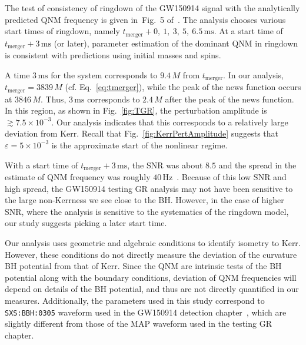 \tgr

The test of consistency of ringdown of the GW150914 signal with the analytically predicted QNM frequency is given in~Fig.~5 of~\cite{TheLIGOScientific:2016src}. The analysis chooses various start times of ringdown, namely $t_\mathrm{merger} + 0,~1,~3,~5,~6.5\,\mathrm{ms}$. At a start time of $t_\mathrm{merger} + 3\,\mathrm{ms}$ (or later), parameter estimation of the dominant QNM in ringdown is consistent with predictions using initial masses and spins. 

A time $3\,\mathrm{ms}$ for the system corresponds to $9.4\,M$ from $t_\mathrm{merger}$. In our analysis, $t_\mathrm{merger} = 3839\,M$ (cf. Eq.~\eqref{eq:tmerger}), while the peak of the news function occurs at $3846\,M$. Thus, $3\,\mathrm{ms}$ corresponds to $2.4\,M$ after the peak of the news function. In this region, as shown in Fig.~\ref{fig:TGR}, the perturbation amplitude is ${}\gtrsim 7.5 \times 10^{-3}$. Our analysis indicates that this corresponds to a relatively large deviation from Kerr. Recall that Fig.~\ref{fig:KerrPertAmplitude} suggests that $\varepsilon = 5 \times 10^{-3}$ is the approximate start of the nonlinear regime. 

With a start time of $t_\mathrm{merger} + 3\,\mathrm{ms}$, the SNR was about $8.5$ and the spread in the estimate of QNM frequency was roughly $40\,\mathrm{Hz}$~\cite{TheLIGOScientific:2016src}. Because of this low SNR and high spread, the GW150914 testing GR analysis may not have been sensitive to the large non-Kerrness we see close to the BH. However, in the case of higher SNR, where the analysis is sensitive to the systematics of the ringdown model, our study suggests picking a later start time. 

Our analysis uses geometric and algebraic conditions to identify isometry to Kerr. However, these conditions do not directly measure the deviation of the curvature BH potential from that of Kerr. Since the QNM are intrinsic tests of the BH potential along with the boundary conditions, deviation of QNM frequencies will depend on details of the BH potential, and thus are not directly quantified in our measures. Additionally, the parameters used in this study correspond to \texttt{SXS:BBH:0305} waveform used in the GW150914 detection chapter~\cite{Abbott:2016blz}, which are slightly different from those of the MAP waveform used in the testing GR chapter. 



